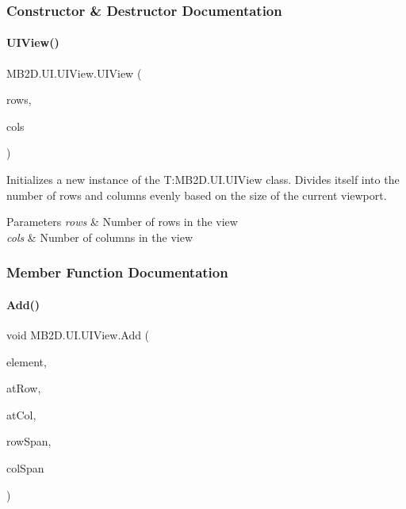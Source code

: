 \subsubsection{Constructor \& Destructor Documentation}
\hypertarget{class_m_b2_d_1_1_u_i_1_1_u_i_view_ad441dede0fc04e04b4137395eaeab376}{}\label{class_m_b2_d_1_1_u_i_1_1_u_i_view_ad441dede0fc04e04b4137395eaeab376} 
\paragraph{\texorpdfstring{U\+I\+View()}{UIView()}}
{\footnotesize\ttfamily M\+B2\+D.\+U\+I.\+U\+I\+View.\+U\+I\+View (\begin{DoxyParamCaption}\item[{int}]{rows,  }\item[{int}]{cols }\end{DoxyParamCaption})\hspace{0.3cm}{\ttfamily [inline]}}



Initializes a new instance of the T\+:\+M\+B2\+D.\+U\+I.\+U\+I\+View class. Divides itself into the number of rows and columns evenly based on the size of the current viewport. 


\begin{DoxyParams}{Parameters}
{\em rows} & Number of rows in the view\\
\hline
{\em cols} & Number of columns in the view\\
\hline
\end{DoxyParams}


\subsubsection{Member Function Documentation}
\hypertarget{class_m_b2_d_1_1_u_i_1_1_u_i_view_a486357124c0a1bc13d1c5909f26a6e2b}{}\label{class_m_b2_d_1_1_u_i_1_1_u_i_view_a486357124c0a1bc13d1c5909f26a6e2b} 
\paragraph{\texorpdfstring{Add()}{Add()}}
{\footnotesize\ttfamily void M\+B2\+D.\+U\+I.\+U\+I\+View.\+Add (\begin{DoxyParamCaption}\item[{\hyperlink{class_m_b2_d_1_1_u_i_1_1_u_i_element}{U\+I\+Element}}]{element,  }\item[{int}]{at\+Row,  }\item[{int}]{at\+Col,  }\item[{int}]{row\+Span,  }\item[{int}]{col\+Span }\end{DoxyParamCaption})\hspace{0.3cm}{\ttfamily [inline]}}



